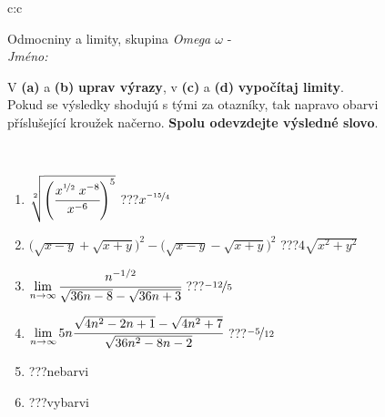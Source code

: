 \documentclass[10pt]{report}
\begin{document}
\newpage
\thispagestyle{empty}
\begin{tabular}{c:c}
\begin{minipage}[c][104.5mm][t]{0.5\linewidth}
\begin{center}
\vspace{7mm}
{\huge Odmocniny a limity, skupina \textit{Omega $\omega$} -}\\[5mm]
\textit{Jméno:}\phantom{xxxxxxxxxxxxxxxxxxxxxxxxxxxxxxxxxxxxxxxxxxxxxxxxxxxxxxxxxxxxxxxxx}\\[5mm]
\begin{minipage}{0.95\linewidth}
\begin{center}
V \textbf{(a)} a \textbf{(b)} \textbf{uprav výrazy}, v \textbf{(c)} a \textbf{(d)} \textbf{vypočítaj limity}.\\Pokud se výsledky shodujú s tými za otazníky, tak napravo obarvi\\příslušející kroužek načerno. \textbf{Spolu odevzdejte výsledné slovo}.
\end{center}
\end{minipage}
\\[1mm]
\begin{minipage}{0.79\linewidth}
\begin{center}
\begin{varwidth}{\linewidth}
\begin{enumerate}
\small
\item $\sqrt[2]{\left(\cfrac{x^{\nicefrac{1}{2}}\;x^{-8}}{x^{-6}}\right)^{5}}$\quad \dotfill\; ???\;\dotfill \quad $x^{\nicefrac{-15}{4}}$
\item {\footnotesize{\scriptsize$\big(\sqrt{x-y}+\sqrt{x+y}\big)^2-\big(\sqrt{x-y}-\sqrt{x+y}\big)^2$}\quad \dotfill\; ???\;\dotfill \quad $4\sqrt{x^2+y^2}$}
\item $\lim\limits_{n\to\infty}\cfrac{n^{-1/2}}{\sqrt{36n-8}-\sqrt{36n+3}}$\quad \dotfill\; ???\;\dotfill \quad $\nicefrac{-12}{5}$
\item $\lim\limits_{n\to\infty}5n\cfrac{\sqrt{4n^2-2n+1}-\sqrt{4n^2+7}}{\sqrt{36n^2-8n-2}}$\quad \dotfill\; ???\;\dotfill \quad $\nicefrac{-5}{12}$
\item \quad \dotfill\; ???\;\dotfill \quad nebarvi
\item \quad \dotfill\; ???\;\dotfill \quad vybarvi
\end{enumerate}
\end{varwidth}
\end{center}
\end{minipage}
\begin{minipage}{0.20\linewidth}

\end{minipage}
\end{center}
\end{minipage}
\end{tabular}
\end{document}
